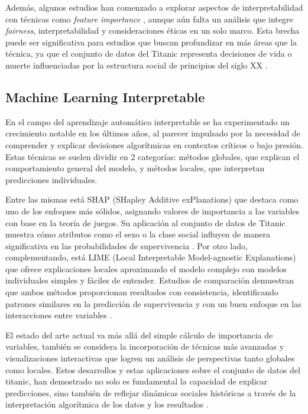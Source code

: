 \documentclass[conference]{IEEEtran}
\begin{document}
Además, algunos estudios han comenzado a explorar aspectos de interpretabilidad con técnicas como \textit{feature importance} \cite{roseborough2024}, aunque aún falta un análisis que integre \textit{fairness}, interpretabilidad y consideraciones éticas en un solo marco. Esta brecha puede ser significativa para estudios que buscan profundizar en más áreas que la técnica, ya que el conjunto de datos del Titanic representa decisiones de vida o muerte influenciadas por la estructura social de principios del siglo XX \cite{frey2011titanic, gupta2018titanic}.


\subsection{Machine Learning Interpretable}

En el campo del aprendizaje automático interpretable se ha experimentado un crecimiento notable en los últimos años, al parecer impulsado por la necesidad de comprender y explicar decisiones algorítmicas en contextos críticos o bajo presión. Estas técnicas se suelen dividir en 2 categorías: métodos globales, que explican el comportamiento general del modelo, y métodos locales, que interpretan predicciones individuales.

Entre las mismas está SHAP (SHapley Additive exPlanations) que destaca como uno de los enfoques más sólidos, asignando valores de importancia a las variables con base en la teoría de juegos. Su aplicación al conjunto de datos de Titanic muestra cómo atributos como el sexo o la clase social influyen de manera significativa en las probabilidades de supervivencia \cite{gaber2020}. Por otro lado, complementando, está LIME (Local Interpretable Model-agnostic Explanations) que ofrece explicaciones locales aproximando el modelo complejo con modelos individuales simples y fáciles de entender. Estudios de comparación demuestran que ambos métodos proporcionan resultados con consistencia, identificando patrones similares en la predicción de supervivencia y con un buen enfoque en las interacciones entre variables \cite{ajumoke2025}.

El estado del arte actual va más allá del simple cálculo de importancia de variables, también se considera la incorporación de técnicas más avanzadas y visualizaciones interactivas que logren un análisis de perspectivas tanto globales como locales. Estos desarrollos y estas aplicaciones sobre el conjunto de datos del titanic, han demostrado no solo es fundamental la capacidad de explicar predicciones, sino también de reflejar dinámicas sociales históricas a través de la interpretación algorítmica de los datos y los resultados \cite{roseborough2024}.
\end{document}

